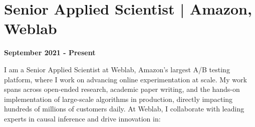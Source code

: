 \documentclass[10pt, a4paper]{article}
\begin{document}

\section*{Senior Applied Scientist | Amazon, Weblab}
\textbf{September 2021 - Present}

I am a Senior Applied Scientist at Weblab, Amazon’s largest A/B testing platform, where I work on advancing online experimentation at scale. My work spans across open-ended research, academic paper writing, and the hands-on implementation of large-scale algorithms in production, directly impacting hundreds of millions of customers daily. At Weblab, I collaborate with leading experts in causal inference and drive innovation in:
\end{document}
